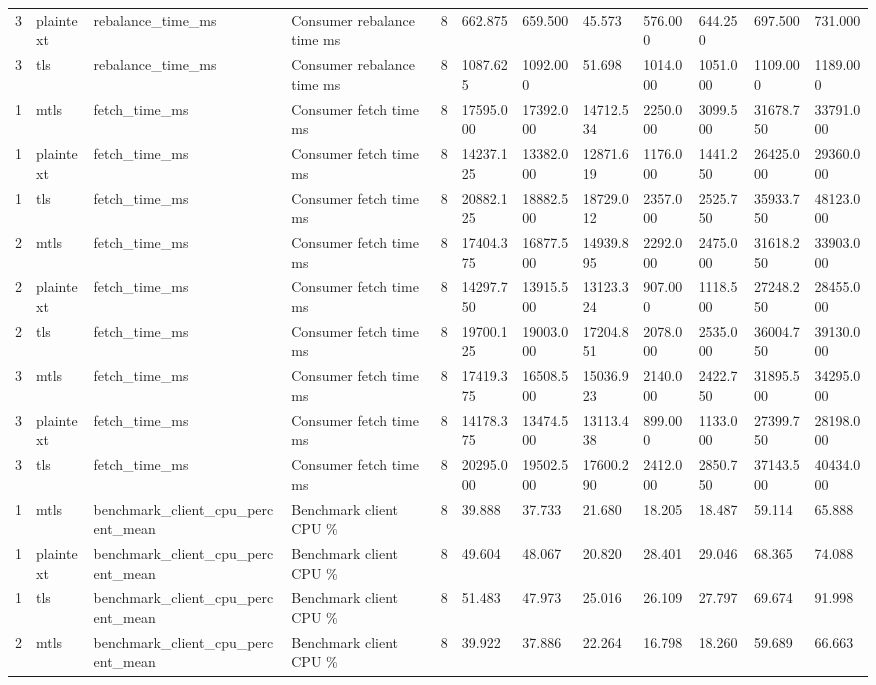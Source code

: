 \begin{longtable}{llllllllllll}
3 & plaintext & rebalance\_time\_ms & Consumer rebalance time ms & 8 & 662.875 & 659.500 & 45.573 & 576.000 & 644.250 & 697.500 & 731.000 \\
3 & tls & rebalance\_time\_ms & Consumer rebalance time ms & 8 & 1087.625 & 1092.000 & 51.698 & 1014.000 & 1051.000 & 1109.000 & 1189.000 \\
1 & mtls & fetch\_time\_ms & Consumer fetch time ms & 8 & 17595.000 & 17392.000 & 14712.534 & 2250.000 & 3099.500 & 31678.750 & 33791.000 \\
1 & plaintext & fetch\_time\_ms & Consumer fetch time ms & 8 & 14237.125 & 13382.000 & 12871.619 & 1176.000 & 1441.250 & 26425.000 & 29360.000 \\
1 & tls & fetch\_time\_ms & Consumer fetch time ms & 8 & 20882.125 & 18882.500 & 18729.012 & 2357.000 & 2525.750 & 35933.750 & 48123.000 \\
2 & mtls & fetch\_time\_ms & Consumer fetch time ms & 8 & 17404.375 & 16877.500 & 14939.895 & 2292.000 & 2475.000 & 31618.250 & 33903.000 \\
2 & plaintext & fetch\_time\_ms & Consumer fetch time ms & 8 & 14297.750 & 13915.500 & 13123.324 & 907.000 & 1118.500 & 27248.250 & 28455.000 \\
2 & tls & fetch\_time\_ms & Consumer fetch time ms & 8 & 19700.125 & 19003.000 & 17204.851 & 2078.000 & 2535.000 & 36004.750 & 39130.000 \\
3 & mtls & fetch\_time\_ms & Consumer fetch time ms & 8 & 17419.375 & 16508.500 & 15036.923 & 2140.000 & 2422.750 & 31895.500 & 34295.000 \\
3 & plaintext & fetch\_time\_ms & Consumer fetch time ms & 8 & 14178.375 & 13474.500 & 13113.438 & 899.000 & 1133.000 & 27399.750 & 28198.000 \\
3 & tls & fetch\_time\_ms & Consumer fetch time ms & 8 & 20295.000 & 19502.500 & 17600.290 & 2412.000 & 2850.750 & 37143.500 & 40434.000 \\
1 & mtls & benchmark\_client\_cpu\_percent\_mean & Benchmark client CPU \% & 8 & 39.888 & 37.733 & 21.680 & 18.205 & 18.487 & 59.114 & 65.888 \\
1 & plaintext & benchmark\_client\_cpu\_percent\_mean & Benchmark client CPU \% & 8 & 49.604 & 48.067 & 20.820 & 28.401 & 29.046 & 68.365 & 74.088 \\
1 & tls & benchmark\_client\_cpu\_percent\_mean & Benchmark client CPU \% & 8 & 51.483 & 47.973 & 25.016 & 26.109 & 27.797 & 69.674 & 91.998 \\
2 & mtls & benchmark\_client\_cpu\_percent\_mean & Benchmark client CPU \% & 8 & 39.922 & 37.886 & 22.264 & 16.798 & 18.260 & 59.689 & 66.663 \\

\end{longtable}

